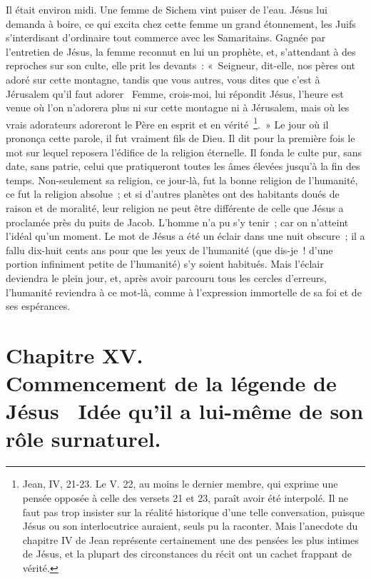 \documentclass[french,twoside]{book} %
\newcommand\chapteropen{} %
\newcommand\chapterclose{} %
\begin{document}
Il était environ midi. Une femme de Sichem vint puiser de l’eau. Jésus lui demanda à boire, ce qui excita chez cette femme un grand étonnement, les Juifs s’interdisant d’ordinaire tout commerce avec les Samaritains. Gagnée par l’entretien de Jésus, la femme reconnut en lui un prophète, et, s’attendant à des reproches sur son culte, elle prit les devants : « Seigneur, dit-elle, nos pères ont adoré sur cette montagne, tandis que vous autres, vous dites que c’est à Jérusalem qu’il faut adorer  Femme, crois-moi, lui répondit Jésus, l’heure est venue où l’on n’adorera plus ni sur cette montagne ni à Jérusalem, mais où les vrais adorateurs adoreront le Père en esprit et en vérité \footnote{Jean, IV, 21-23. Le V. 22, au moins le dernier membre, qui exprime une pensée opposée à celle des versets 21 et 23, paraît avoir été interpolé. Il ne faut pas trop insister sur la réalité historique d’une telle conversation, puisque Jésus ou son interlocutrice auraient, seuls pu la raconter. Mais l’anecdote du chapitre IV de Jean représente certainement une des pensées les plus intimes de Jésus, et la plupart des circonstances du récit ont un cachet frappant de vérité.}. » Le jour où il prononça cette parole, il fut vraiment fils de Dieu. Il dit pour la première fois le mot sur lequel reposera l’édifice de la religion éternelle. Il fonda le culte pur, sans date, sans patrie, celui que pratiqueront toutes les âmes élevées jusqu’à la fin des temps. Non-seulement sa religion, ce jour-là, fut la bonne religion de l’humanité, ce fut la religion absolue ; et si d’autres planètes ont des habitants doués de raison et de moralité, leur religion ne peut être différente de celle que Jésus a proclamée près du puits de Jacob. L’homme n’a pu s’y tenir ; car on n’atteint l’idéal qu’un moment. Le mot de Jésus a été un éclair dans une nuit obscure ; il a fallu dix-huit cents ans pour que les yeux de l’humanité (que dis-je ! d’une portion infiniment petite de l’humanité) s’y soient habitués. Mais l’éclair deviendra le plein jour, et, après avoir parcouru tous les cercles d’erreurs, l’humanité reviendra à ce mot-là, comme à l’expression immortelle de sa foi et de ses espérances.
\chapterclose


\chapteropen
\chapter[{Chapitre XV. Commencement de la légende de Jésus  Idée qu’il a lui-même de son rôle surnaturel.}]{Chapitre XV.\\
Commencement de la légende de Jésus  Idée qu’il a lui-même de son rôle surnaturel.}\renewcommand{\leftmark}{Chapitre XV.\\
Commencement de la légende de Jésus  Idée qu’il a lui-même de son rôle surnaturel.}
\end{document}

